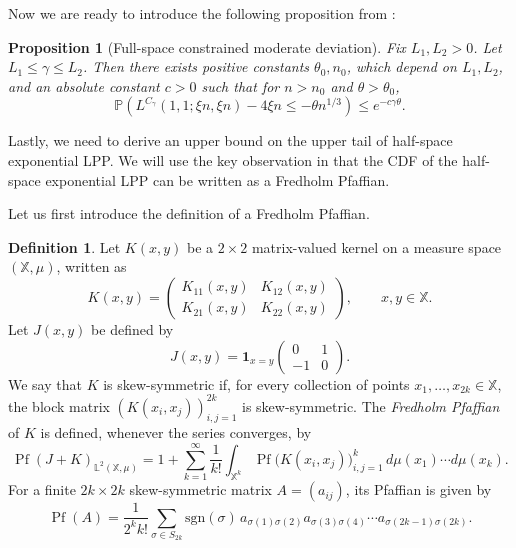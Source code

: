 \documentclass[11pt]{article}
\newtheorem{proposition}[theorem]{Proposition}
\theoremstyle{definition}
\newtheorem{definition}[theorem]{Definition}
\newcommand{\Prob}{\mathbb{P}}
\begin{document}
Now we are ready to introduce the following proposition from \cite[Proposition 3.7]{basu2022interlacing}:

\begin{proposition}[Full-space constrained moderate deviation]
\label{prop:constrained_moderate}
Fix $L_1, L_2 > 0$. Let $L_1 \leq \gamma \leq L_2$. Then there exists positive constants $\theta_0, n_0$, which depend on $L_1, L_2$, and an absolute constant $c>0$ such that for $n > n_0$ and $\theta > \theta_0$,
\begin{equation}
    \Prob\left(L^{C_\gamma}(1,1;\xi n, \xi n) - 4 \xi n \leq - \theta n^{1/3}\right) \leq e^{-c \gamma \theta}.
\end{equation}
\end{proposition}

Lastly, we need to derive an upper bound on the upper tail of half-space exponential LPP. We will use the key observation in \cite{Pfaffian_Schur} that the CDF of the half-space exponential LPP can be written as a Fredholm Pfaffian.



Let us first introduce the definition of a Fredholm Pfaffian.
\begin{definition}
Let \( K(x,y) \) be a \(2\times 2\) matrix-valued kernel on a measure space \((\mathbb{X},\mu)\), written as
\[
K(x,y) =
\begin{pmatrix}
K_{11}(x,y) & K_{12}(x,y)\\[2pt]
K_{21}(x,y) & K_{22}(x,y)
\end{pmatrix}, \qquad x,y \in \mathbb{X}.
\]
Let \(J(x,y)\) be defined by
\[
J(x,y) = \mathbf{1}_{x=y}
\begin{pmatrix}
0 & 1\\[2pt]
-1 & 0
\end{pmatrix}.
\]
We say that \(K\) is skew-symmetric if, for every collection of points
\(x_1,\ldots,x_{2k} \in \mathbb{X}\), the block matrix
\((K(x_i,x_j))_{i,j=1}^{2k}\) is skew-symmetric.
The \emph{Fredholm Pfaffian} of \(K\) is defined, whenever the series converges, by
\[
\operatorname{Pf}(J + K)_{\mathbb{L}^2(\mathbb{X},\mu)}
= 1 + \sum_{k=1}^{\infty} \frac{1}{k!}
\int_{\mathbb{X}^k}
\operatorname{Pf}\!\big( K(x_i,x_j) \big)_{i,j=1}^{k}
\, d\mu(x_1)\cdots d\mu(x_k).
\]
For a finite \(2k\times 2k\) skew-symmetric matrix \(A = (a_{ij})\),
its Pfaffian is given by
\[
\operatorname{Pf}(A)
= \frac{1}{2^k k!}
\sum_{\sigma \in S_{2k}}
\mathrm{sgn}(\sigma)
\, a_{\sigma(1)\sigma(2)} a_{\sigma(3)\sigma(4)} \cdots a_{\sigma(2k-1)\sigma(2k)}.
\]
\end{definition}
\end{document}
